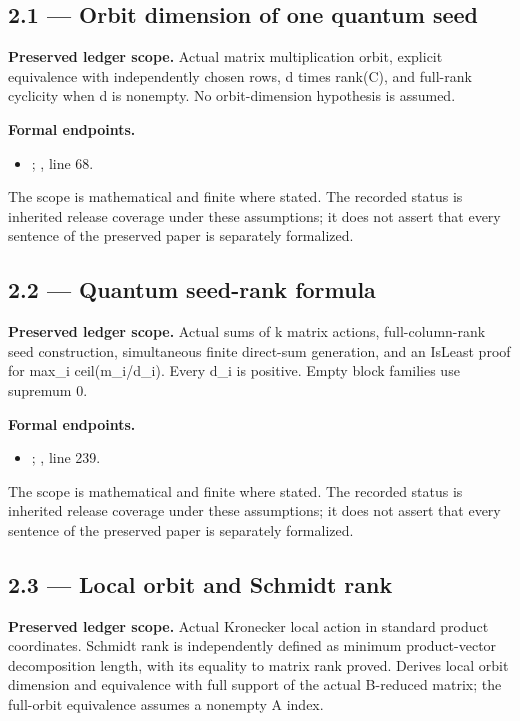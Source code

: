 \subsection{2.1 — Orbit dimension of one quantum seed}
\label{result:2.1}
\textbf{Preserved ledger scope.} Actual matrix multiplication orbit, explicit equivalence with independently chosen rows, d times rank(C), and full-rank cyclicity when d is nonempty. No orbit-dimension hypothesis is assumed.

\textbf{Formal endpoints.}\begin{itemize}
\item {}; , line 68.
\end{itemize}
The scope is mathematical and finite where stated. The recorded status is inherited release coverage under these assumptions; it does not assert that every sentence of the preserved paper is separately formalized.

\subsection{2.2 — Quantum seed-rank formula}
\label{result:2.2}
\textbf{Preserved ledger scope.} Actual sums of k matrix actions, full-column-rank seed construction, simultaneous finite direct-sum generation, and an IsLeast proof for max\_i ceil(m\_i/d\_i). Every d\_i is positive. Empty block families use supremum 0.

\textbf{Formal endpoints.}\begin{itemize}
\item {}; , line 239.
\end{itemize}
The scope is mathematical and finite where stated. The recorded status is inherited release coverage under these assumptions; it does not assert that every sentence of the preserved paper is separately formalized.

\subsection{2.3 — Local orbit and Schmidt rank}
\label{result:2.3}
\textbf{Preserved ledger scope.} Actual Kronecker local action in standard product coordinates. Schmidt rank is independently defined as minimum product-vector decomposition length, with its equality to matrix rank proved. Derives local orbit dimension and equivalence with full support of the actual B-reduced matrix; the full-orbit equivalence assumes a nonempty A index.

